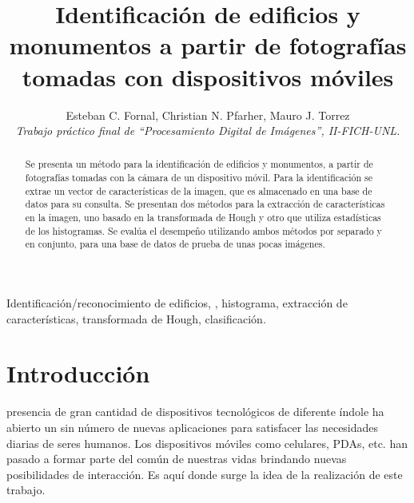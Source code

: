\documentclass[conference,spanish,a4paper,10pt,oneside,final]{tfmpd}
\begin{document}
\title{Identificación de edificios y monumentos a partir de fotografías
tomadas con dispositivos móviles}
\author{Esteban C. Fornal, Christian N. Pfarher, Mauro J. Torrez\\
\textit{Trabajo práctico final de ``Procesamiento Digital de
Imágenes'', II-FICH-UNL.}}
\maketitle
%
%
%
%
\begin{abstract}
Se presenta un método para la identificación de edificios y monumentos, a
partir de fotografías tomadas con la cámara de un dispositivo móvil.
Para la identificación se extrae un vector de características de la imagen,
que es almacenado en una base de datos para su consulta.
Se presentan dos métodos para la extracción de características en la imagen, uno
basado en la transformada de Hough y otro que utiliza estadísticas de los
histogramas. Se evalúa el desempeño utilizando ambos métodos por separado y en
conjunto, para una base de datos de prueba de unas pocas imágenes.
\end{abstract}
%
%
%
%
\begin{keywords}
Identificación/reconocimiento de edificios, ,
histograma, extracción de características, transformada de Hough, clasificación.
\end{keywords}
%
%
%
%
\section{Introducción}
 presencia de gran cantidad de dispositivos tecnológicos de
diferente índole ha abierto un sin número de nuevas aplicaciones para
satisfacer las necesidades diarias de seres humanos. Los dispositivos móviles
como celulares, PDAs, etc. han pasado a formar parte del común de nuestras
vidas brindando nuevas posibilidades de interacción. Es aquí donde surge la
idea de la realización de este trabajo. 
\end{document}
